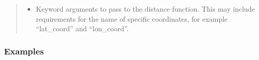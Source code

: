 \documentclass[letterpaper,10pt,english]{sphinxmanual}
\begin{document}
\begin{fulllineitems}
\begin{fulllineitems}
\begin{quote}
\begin{description}
\begin{itemize}
\item {}
\sphinxAtStartPar
{} \textendash{} Keyword arguments to pass to the distance function. This may include
requirements for the name of specific coordinates, for example
“lat\_coord” and “lon\_coord”.

\end{itemize}

\sphinxAtStartPar
{}

\end{description}\end{quote}
\subsubsection*{Examples}


\end{fulllineitems}
\end{fulllineitems}
\end{document}
